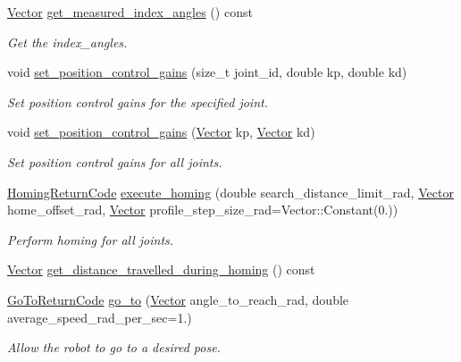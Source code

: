 \begin{DoxyCompactItemize}
\hyperlink{classblmc__robots_1_1BlmcJointModules_abaff382c6fd4b494ec0c17498d94919e}{Vector} \hyperlink{classblmc__robots_1_1BlmcJointModules_afe8ecc2225292e2a4358b375465b0c93}{get\+\_\+measured\+\_\+index\+\_\+angles} () const
\begin{DoxyCompactList}\small\item\em Get the index\+\_\+angles. \end{DoxyCompactList}\item 
void \hyperlink{classblmc__robots_1_1BlmcJointModules_ada76994634fd0f15fb5df311a61e97d7}{set\+\_\+position\+\_\+control\+\_\+gains} (size\+\_\+t joint\+\_\+id, double kp, double kd)
\begin{DoxyCompactList}\small\item\em Set position control gains for the specified joint. \end{DoxyCompactList}\item 
void \hyperlink{classblmc__robots_1_1BlmcJointModules_a524fd41f808027190d59460a4787aea6}{set\+\_\+position\+\_\+control\+\_\+gains} (\hyperlink{classblmc__robots_1_1BlmcJointModules_abaff382c6fd4b494ec0c17498d94919e}{Vector} kp, \hyperlink{classblmc__robots_1_1BlmcJointModules_abaff382c6fd4b494ec0c17498d94919e}{Vector} kd)
\begin{DoxyCompactList}\small\item\em Set position control gains for all joints. \end{DoxyCompactList}\item 
\hyperlink{blmc__joint__module_8hpp_aa1075809042ff261e4b0a20d161448b6}{Homing\+Return\+Code} \hyperlink{classblmc__robots_1_1BlmcJointModules_a4b3dfee12a87fddf81961fab48e3dae4}{execute\+\_\+homing} (double search\+\_\+distance\+\_\+limit\+\_\+rad, \hyperlink{classblmc__robots_1_1BlmcJointModules_abaff382c6fd4b494ec0c17498d94919e}{Vector} home\+\_\+offset\+\_\+rad, \hyperlink{classblmc__robots_1_1BlmcJointModules_abaff382c6fd4b494ec0c17498d94919e}{Vector} profile\+\_\+step\+\_\+size\+\_\+rad=Vector\+::\+Constant(0.))
\begin{DoxyCompactList}\small\item\em Perform homing for all joints. \end{DoxyCompactList}\item 
\hyperlink{classblmc__robots_1_1BlmcJointModules_abaff382c6fd4b494ec0c17498d94919e}{Vector} \hyperlink{classblmc__robots_1_1BlmcJointModules_afa312ed7c7c5129b547b26b6fa3bab2e}{get\+\_\+distance\+\_\+travelled\+\_\+during\+\_\+homing} () const
\item 
\hyperlink{blmc__joint__module_8hpp_ae2dd8b0230887c948d2583feb6beb051}{Go\+To\+Return\+Code} \hyperlink{classblmc__robots_1_1BlmcJointModules_afc82da986738d3a2265e5cf6337d3251}{go\+\_\+to} (\hyperlink{classblmc__robots_1_1BlmcJointModules_abaff382c6fd4b494ec0c17498d94919e}{Vector} angle\+\_\+to\+\_\+reach\+\_\+rad, double average\+\_\+speed\+\_\+rad\+\_\+per\+\_\+sec=1.)
\begin{DoxyCompactList}\small\item\em Allow the robot to go to a desired pose. \end{DoxyCompactList}\end{DoxyCompactItemize}
